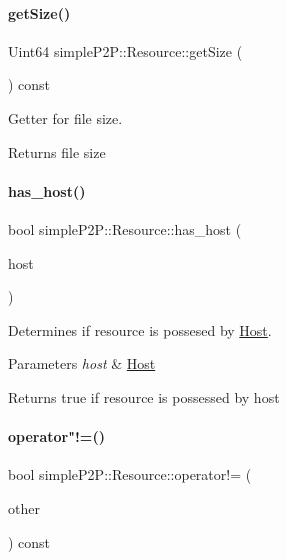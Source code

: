 \paragraph{\texorpdfstring{get\+Size()}{getSize()}}
{\footnotesize\ttfamily Uint64 simple\+P2\+P\+::\+Resource\+::get\+Size (\begin{DoxyParamCaption}{ }\end{DoxyParamCaption}) const}



Getter for file size. 

\begin{DoxyReturn}{Returns}
file size 
\end{DoxyReturn}
\mbox{\label{classsimpleP2P_1_1Resource_ac3c067c66ef0db0a25a7904a83f50e3d}} 
\paragraph{\texorpdfstring{has\+\_\+host()}{has\_host()}}
{\footnotesize\ttfamily bool simple\+P2\+P\+::\+Resource\+::has\+\_\+host (\begin{DoxyParamCaption}\item[{\hyperlink{classsimpleP2P_1_1Host}{simple\+P2\+P\+::\+Host}}]{host }\end{DoxyParamCaption})}



Determines if resource is possesed by \hyperlink{classsimpleP2P_1_1Host}{Host}. 


\begin{DoxyParams}{Parameters}
{\em host} & \hyperlink{classsimpleP2P_1_1Host}{Host} \\
\hline
\end{DoxyParams}
\begin{DoxyReturn}{Returns}
true if resource is possessed by host 
\end{DoxyReturn}
\mbox{\label{classsimpleP2P_1_1Resource_a5694c4c5a3d5b303a1fa0dcb3fb478b1}} 
\paragraph{\texorpdfstring{operator"!=()}{operator!=()}}
{\footnotesize\ttfamily bool simple\+P2\+P\+::\+Resource\+::operator!= (\begin{DoxyParamCaption}\item[{const \hyperlink{classsimpleP2P_1_1Resource}{Resource} \&}]{other }\end{DoxyParamCaption}) const}



